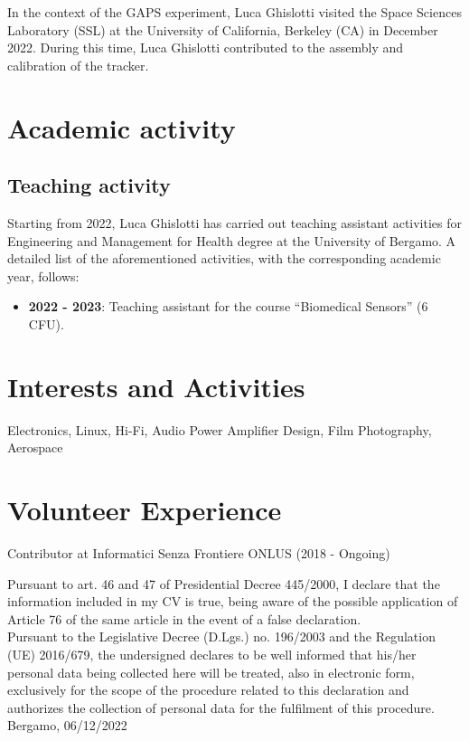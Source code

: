 \documentclass[11pt]{article}
\begin{document}
\noindent
In the context of the GAPS experiment, Luca Ghislotti visited the Space Sciences Laboratory (SSL) at the University of California, Berkeley (CA) in December 2022. During this time, Luca Ghislotti contributed to the assembly and calibration of the tracker.

\bigskip
\section*{Academic activity}
\subsection*{Teaching activity}
Starting from 2022, Luca Ghislotti has carried out teaching assistant activities for Engineering and Management for Health degree at the University of Bergamo. A detailed list of the aforementioned activities, with the corresponding academic year, follows:\\

\vspace{-0.5em}
\begin{itemize}
	\item \textbf{2022 - 2023}: Teaching assistant for the course “Biomedical Sensors” (6 CFU).
\end{itemize}


\bigskip
\section*{Interests and Activities}
Electronics, Linux, Hi-Fi,  Audio Power Amplifier Design, Film Photography, Aerospace

\bigskip
\section*{Volunteer Experience}
Contributor at Informatici Senza Frontiere ONLUS (2018 - Ongoing)

\vspace{1cm}
\noindent
Pursuant to art. 46 and 47 of Presidential Decree 445/2000, I declare that the information included in my CV is true, being aware of the possible application of Article 76 of the same article in the event of a false declaration.\\
Pursuant to the Legislative Decree (D.Lgs.) no. 196/2003 and the Regulation (UE) 2016/679, the undersigned declares to be well informed that his/her personal data being collected here will be treated, also in electronic form, exclusively for the scope of the procedure related to this declaration and authorizes the collection of personal data for the fulfilment of this procedure.\\

\bigskip
Bergamo, 06/12/2022
\vspace{1cm}
\end{document}

